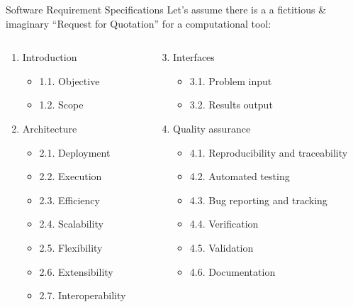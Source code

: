 \documentclass[
  ignorenonframetext,
  aspectratio=169,
]{beamer}
\providecommand{\tightlist}{%
  \setlength{\itemsep}{0pt}\setlength{\parskip}{0pt}}
\begin{document}
\begin{frame}{Software Requirement Specifications}
\protect\hypertarget{software-requirement-specifications}{}
Let's assume there is a a fictitious \& imaginary ``Request for
Quotation'' for a computational tool:

\begin{columns}[T]
\begin{column}{0.35\textwidth}
\begin{enumerate}
\tightlist
\item
  Introduction

  \begin{itemize}
  \tightlist
  \item
    1.1. Objective
  \item
    1.2. Scope
  \end{itemize}
\item
  Architecture

  \begin{itemize}
  \tightlist
  \item
    2.1. Deployment
  \item
    2.2. Execution
  \item
    2.3. Efficiency
  \item
    2.4. Scalability
  \item
    2.5. Flexibility
  \item
    2.6. Extensibility
  \item
    2.7. Interoperability
  \end{itemize}
\end{enumerate}
\end{column}

\begin{column}{0.5\textwidth}
\begin{enumerate}
\setcounter{enumi}{2}
\tightlist
\item
  Interfaces

  \begin{itemize}
  \tightlist
  \item
    3.1. Problem input
  \item
    3.2. Results output
  \end{itemize}
\item
  Quality assurance

  \begin{itemize}
  \tightlist
  \item
    4.1. Reproducibility and traceability
  \item
    4.2. Automated testing
  \item
    4.3. Bug reporting and tracking
  \item
    4.4. Verification
  \item
    4.5. Validation
  \item
    4.6. Documentation
  \end{itemize}
\end{enumerate}
\end{column}
\end{columns}


\end{frame}
\end{document}
